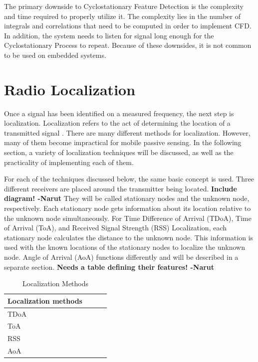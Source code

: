 The primary downside to Cyclostationary Feature Detection is the complexity and time required to properly utilize it. The complexity lies in the number of integrals and correlations that need to be computed in order to implement CFD. In addition, the system needs to listen for signal long enough for the Cyclostationary Process to repeat. Because of these downsides, it is not common to be used on embedded systems. \par

\section{Radio Localization}
Once a signal has been identified on a measured frequency, the next step is localization. Localization refers to the act of determining the location of a transmitted signal \cite{local_conf}. There are many different methods for localization. However, many of them become impractical for mobile passive sensing. In the following section, a variety of localization techniques will be discussed, as well as the practicality of implementing each of them.\par
For each of the techniques discussed below, the same basic concept is used. Three different receivers are placed around the transmitter being located. \textbf{Include diagram! -Narut} They will be called stationary nodes and the unknown node, respectively. Each stationary node gets information about its location relative to the unknown node simultaneously. For Time Difference of Arrival (TDoA), Time of Arrival (ToA), and Received Signal Strength (RSS) Localization, each stationary node calculates the distance to the unknown node. This information is used with the known locations of the stationary nodes to localize the unknown node. Angle of Arrival (AoA) functions differently and will be described in a separate section. \textbf{Needs a table defining their features! -Narut}
\begin{table}[ht]
\centering
\caption{Localization Methods}
\label{table:local_methods}
\begin{tabular}{|l|l|l|l|}
    \hline
  Localization methods  & & &  \\ \hline
         TDoA           & & & \\
          ToA           & & & \\
          RSS           & & & \\
          AoA           & & & \\
    \hline
\end{tabular}
\end{table}\par
